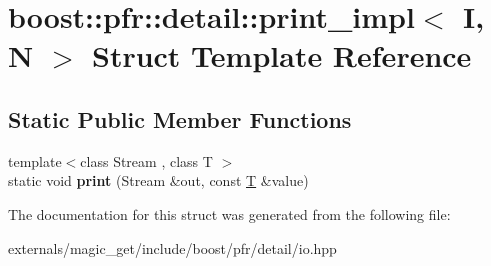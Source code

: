 \hypertarget{structboost_1_1pfr_1_1detail_1_1print__impl}{}\section{boost\+:\+:pfr\+:\+:detail\+:\+:print\+\_\+impl$<$ I, N $>$ Struct Template Reference}
\label{structboost_1_1pfr_1_1detail_1_1print__impl}
\subsection*{Static Public Member Functions}
\begin{DoxyCompactItemize}
\item 
\mbox{\label{structboost_1_1pfr_1_1detail_1_1print__impl_a910c49c91b39bdfcf3555384cfb7d96a}} 
{\footnotesize template$<$class Stream , class T $>$ }\\static void {\bfseries print} (Stream \&out, const \mbox{\hyperlink{struct_t}{T}} \&value)
\end{DoxyCompactItemize}


The documentation for this struct was generated from the following file\+:\begin{DoxyCompactItemize}
\item 
externals/magic\+\_\+get/include/boost/pfr/detail/io.\+hpp\end{DoxyCompactItemize}
